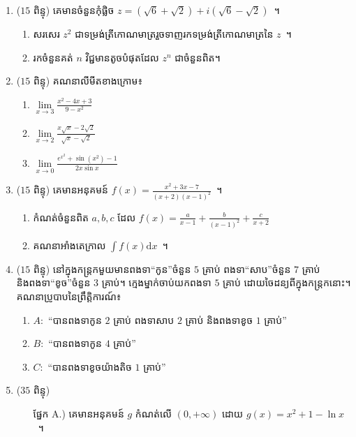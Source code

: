 \documentclass[12pt,a4paper]{article}
\def\hhard{\leavevmode\makebox[0pt][r]{\large\ensuremath{\star\star}\hspace{2em}}}
\begin{document}
\begin{enumerate}[I]
\item ($ 15 $ ពិន្ទុ) គេមានចំនួនកុំផ្លិច $ z=(\sqrt{6}+\sqrt{2})+i(\sqrt{6}-\sqrt{2}) $~។
\begin{enumerate}[1]
\item សរសេរ $ z^2 $ ជាទម្រង់ត្រីកោណមាត្ររួចទាញរកទម្រង់ត្រីកោណមាត្រនៃ $ z $~។
\item រកចំនួនគត់ $ n $ វិជ្ជមានតូចបំផុតដែល $ z^n $ ជាចំនួនពិត។
\end{enumerate}
\item ($ 15 $ ពិន្ទុ) គណនាលីមីតខាងក្រោម៖
\begin{multicols}{3}
\begin{enumerate}[a]
\item $ \lim\limits_{x\to 3}\frac{x^2-4x+3}{9-x^2} $
\item $ \lim\limits_{x\to 2}\frac{x\sqrt{x}-2\sqrt{2}}{\sqrt{x}-\sqrt{2}} $
\item $ \lim\limits_{x\to 0}\frac{e^{x^2}+\sin (x^2)-1}{2x\sin x} $
\end{enumerate}
\end{multicols}
\item ($ 15 $ ពិន្ទុ) គេមានអនុគមន៍ $ f(x)=\frac{x^2+3x-7}{(x+2)(x-1)^2} $~។
\begin{enumerate}[1]
\item កំណត់ចំនួនពិត $ a,b,c $ ដែល $ f(x)=\frac{a}{x-1}+\frac{b}{(x-1)^2}+\frac{c}{x+2} $
\item គណនាអាំងតេក្រាល $ \int f(x)\mathrm{d}x $~។
\end{enumerate}
\item ($ 15 $ ពិន្ទុ) នៅក្នុងកន្ត្រកមួយមានពងទា``កូន''ចំនួន $ 5 $ គ្រាប់ ពងទា``សាប''ចំនួន $ 7 $ គ្រាប់ និងពងទា``ខូច''ចំនួន $ 3 $ គ្រាប់។ ក្មេងម្នាក់ចាប់យកពងទា $ 5 $ គ្រាប់ ដោយចៃដន្យពីក្នុងកន្ត្រកនោះ។\\
គណនាប្រូបាបនៃព្រឹត្តិការណ៍៖
\begin{enumerate}[a]
\item $ A: $ ``បានពងទាកូន $ 2 $ គ្រាប់ ពងទាសាប $ 2 $ គ្រាប់ និងពងទាខូច $ 1 $ គ្រាប់''
\item $ B: $ ``បានពងទាកូន $ 4 $ គ្រាប់''
\item $ C: $ ``បានពងទាខូចយ៉ាងតិច $ 1 $ គ្រាប់''
\end{enumerate}
\item\hhard ($ 35 $ ពិន្ទុ) 
\begin{itemize}
\item[ផ្នែក A.)] គេមានអនុគមន៍ $ g $ កំណត់លើ $ (0,+\infty) $ ដោយ $ g(x)=x^2+1-\ln x $~។
\begin{enumerate}[a]

\end{enumerate}
\end{itemize}
\end{enumerate}
\end{document}

